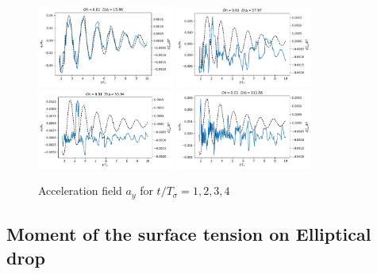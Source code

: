 \documentclass[10pt,a4paper,openany]{article}
\theoremstyle{mytheoremstyle}
\theoremstyle{mytheoremstyle}
\theoremstyle{myproblemstyle}
\begin{document}
\begin{figure}[h!]
    \centering
    \includegraphics[width=0.4\textwidth]{image/Tension/Asym/Ax_Bo_0_1_ndc_10.pdf}
    \includegraphics[width=0.4\textwidth]{image/Tension/Asym/Ax_Bo_0_1_ndc_20.pdf}
    \includegraphics[width=0.4\textwidth]{image/Tension/Asym/Ax_Bo_0_1_ndc_30.pdf}
    \includegraphics[width=0.4\textwidth]{image/Tension/Asym/Ax_Bo_0_1_ndc_60.pdf}
    \caption{Acceleration field $a_y$ for $t /T_\sigma = 1, 2, 3, 4$}
\end{figure}

\subsection{Moment of the surface tension on Elliptical drop}
\end{document}

